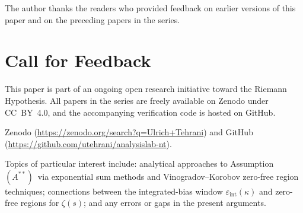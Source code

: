 \documentclass[11pt]{article}
\newcommand{\Astar}{\ensuremath{(A^{**})}}  %
\begin{document}
The author thanks the readers who provided feedback on earlier
versions of this paper and on the preceding papers in the series.

\section*{Call for Feedback}

This paper is part of an ongoing open research initiative toward
the Riemann Hypothesis.
All papers in the series are freely available on Zenodo under CC~BY~4.0,
and the accompanying verification code is hosted on GitHub.

{\sloppy
Zenodo (\url{https://zenodo.org/search?q=Ulrich+Tehrani}) and GitHub
(\url{https://github.com/utehrani/analysislab-nt}).
\par}

Topics of particular interest include:
analytical approaches to Assumption~\Astar\ via exponential sum methods
and Vinogradov--Korobov zero-free region techniques;
connections between the integrated-bias window $\varepsilon_{\mathrm{int}}(\kappa)$
and zero-free regions for $\zeta(s)$;
and any errors or gaps in the present arguments.
\end{document}
